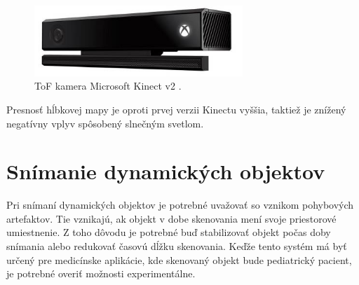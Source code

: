 \begin{figure}[H]
	\centering
	\includegraphics[width=0.7\textwidth]{figures/kinect.png}
	\caption{ToF kamera Microsoft Kinect v2 \cite{sekelova}.}
	\label{fig::kinect}
\end{figure}

Presnosť hĺbkovej mapy je oproti prvej verzii Kinectu vyššia, taktiež je znížený negatívny vplyv spôsobený slnečným svetlom.


%
%
%

\section{Snímanie dynamických objektov}

Pri snímaní dynamických objektov je potrebné uvažovať so vznikom pohybových artefaktov. Tie vznikajú, ak objekt v dobe skenovania mení svoje priestorové umiestnenie. Z toho dôvodu je potrebné buď stabilizovať objekt počas doby snímania alebo redukovať časovú dĺžku skenovania. Keďže tento systém má byť určený pre medicínske aplikácie, kde skenovaný objekt bude pediatrický pacient, je potrebné overiť možnosti experimentálne.


